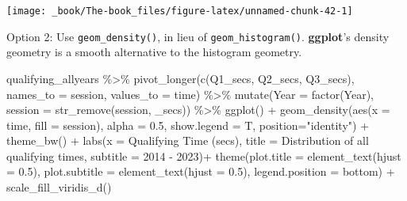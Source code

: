 \documentclass[
]{book}
\newenvironment{Shaded}{\begin{snugshade}}{\end{snugshade}}
\newcommand{\AttributeTok}[1]{\textcolor[rgb]{0.77,0.63,0.00}{#1}}
\newcommand{\FloatTok}[1]{\textcolor[rgb]{0.00,0.00,0.81}{#1}}
\newcommand{\FunctionTok}[1]{\textcolor[rgb]{0.00,0.00,0.00}{#1}}
\newcommand{\NormalTok}[1]{#1}
\newcommand{\SpecialCharTok}[1]{\textcolor[rgb]{0.00,0.00,0.00}{#1}}
\newcommand{\StringTok}[1]{\textcolor[rgb]{0.31,0.60,0.02}{#1}}
\begin{document}
\begin{center}\texttt{[image: \_book/The-book\_files/figure-latex/unnamed-chunk-42-1]} \end{center}

Option 2: Use \texttt{geom\_density()}, in lieu of \texttt{geom\_histogram()}. \textbf{ggplot}'s density geometry is a smooth alternative to the histogram geometry.

\begin{Shaded}
\begin{Highlighting}[]
\NormalTok{qualifying\_allyears }\SpecialCharTok{\%\textgreater{}\%}
  \FunctionTok{pivot\_longer}\NormalTok{(}\FunctionTok{c}\NormalTok{(}\StringTok{\textquotesingle{}Q1\_secs\textquotesingle{}}\NormalTok{, }\StringTok{\textquotesingle{}Q2\_secs\textquotesingle{}}\NormalTok{, }\StringTok{\textquotesingle{}Q3\_secs\textquotesingle{}}\NormalTok{),}
               \AttributeTok{names\_to =} \StringTok{\textquotesingle{}session\textquotesingle{}}\NormalTok{,}
               \AttributeTok{values\_to =} \StringTok{\textquotesingle{}time\textquotesingle{}}\NormalTok{) }\SpecialCharTok{\%\textgreater{}\%}
  \FunctionTok{mutate}\NormalTok{(}\AttributeTok{Year =} \FunctionTok{factor}\NormalTok{(Year),}
         \AttributeTok{session =} \FunctionTok{str\_remove}\NormalTok{(session, }\StringTok{\textquotesingle{}\_secs\textquotesingle{}}\NormalTok{)) }\SpecialCharTok{\%\textgreater{}\%}
  \FunctionTok{ggplot}\NormalTok{() }\SpecialCharTok{+}
  \FunctionTok{geom\_density}\NormalTok{(}\FunctionTok{aes}\NormalTok{(}\AttributeTok{x =}\NormalTok{ time, }\AttributeTok{fill =}\NormalTok{ session),}
                 \AttributeTok{alpha =} \FloatTok{0.5}\NormalTok{, }\AttributeTok{show.legend =}\NormalTok{ T,}
                 \AttributeTok{position=}\StringTok{"identity"}\NormalTok{) }\SpecialCharTok{+}
  \FunctionTok{theme\_bw}\NormalTok{() }\SpecialCharTok{+}
  \FunctionTok{labs}\NormalTok{(}\AttributeTok{x =} \StringTok{\textquotesingle{}Qualifying Time (secs)\textquotesingle{}}\NormalTok{,}
       \AttributeTok{title =} \StringTok{\textquotesingle{}Distribution of all qualifying times\textquotesingle{}}\NormalTok{,}
       \AttributeTok{subtitle =} \StringTok{\textquotesingle{}2014 {-} 2023\textquotesingle{}}\NormalTok{)}\SpecialCharTok{+}
  \FunctionTok{theme}\NormalTok{(}\AttributeTok{plot.title =} \FunctionTok{element\_text}\NormalTok{(}\AttributeTok{hjust =} \FloatTok{0.5}\NormalTok{),}
        \AttributeTok{plot.subtitle =} \FunctionTok{element\_text}\NormalTok{(}\AttributeTok{hjust =} \FloatTok{0.5}\NormalTok{),}
        \AttributeTok{legend.position =} \StringTok{\textquotesingle{}bottom\textquotesingle{}}\NormalTok{) }\SpecialCharTok{+}
  \FunctionTok{scale\_fill\_viridis\_d}\NormalTok{()}
\end{Highlighting}
\end{Shaded}
\end{document}

